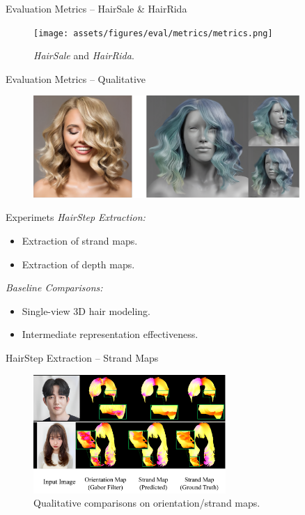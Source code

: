 \begin{frame}[t]{Evaluation Metrics -- HairSale \& HairRida}
    \begin{figure}
        \centering
        \texttt{[image: assets/figures/eval/metrics/metrics.png]}
        \caption{\textit{HairSale} and \textit{HairRida}.}
    \end{figure}
\end{frame}

\begin{frame}{Evaluation Metrics -- Qualitative}
    \begin{figure}
        \centering
        \includegraphics[width=0.9\textwidth]{assets/figures/eval/metrics/input-output.png}
    \end{figure}
\end{frame}


\begin{frame}[t]{Experimets}
    \emph{HairStep Extraction:}
    \begin{itemize}
        \item Extraction of strand maps.
        \item Extraction of depth maps.
    \end{itemize}
    \emph{Baseline Comparisons:}
    \begin{itemize}
        \item Single-view 3D hair modeling.
        \item Intermediate representation effectiveness.
    \end{itemize}
\end{frame}


\begin{frame}{HairStep Extraction -- Strand Maps}
    \begin{figure}
        \centering
        \includegraphics[width=0.65\textwidth]{assets/figures/eval/hairsale/strand-prediction-comparison.png}
        \caption{Qualitative comparisons on orientation/strand maps.}
    \end{figure}
\end{frame}


